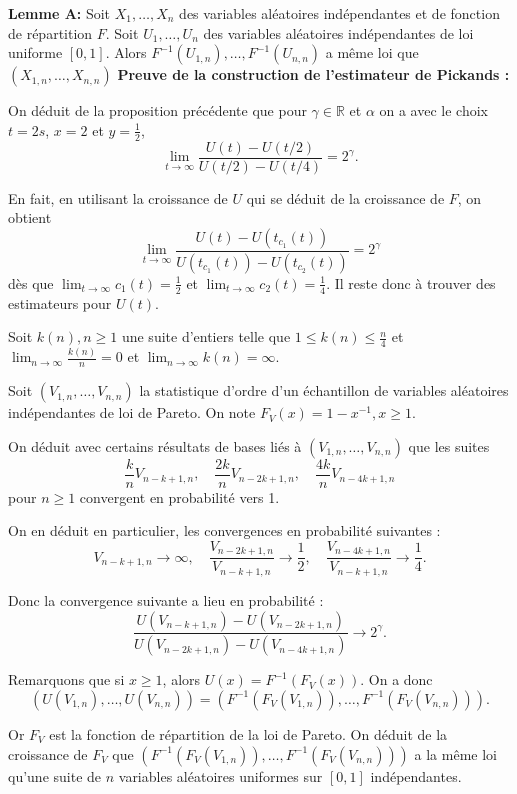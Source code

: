 \documentclass{article}
\theoremstyle{plain}
\theoremstyle{definition}
\theoremstyle{plain}
\begin{document}
\textbf{Lemme A:}
Soit \(X_1, \dots, X_n\) des variables aléatoires indépendantes et de fonction de répartition \(F\).
Soit \(U_1, \dots, U_n\) des variables aléatoires indépendantes de loi uniforme \(\left[0,1\right]\). Alors \(F^{-1}(U_{1,n}), \dots, F^{-1}(U_{n,n})\) a même loi que \((X_{1,n}, \dots, X_{n,n})\)\newline
\textbf{Preuve de la construction de l'estimateur de Pickands :}

On déduit de la proposition précédente que pour $\gamma \in \mathbb{R}$ et $\alpha$ on a avec le choix $t = 2s$, $x = 2$ et $y = \frac{1}{2}$,
\[
\lim_{t \to \infty} \frac{U(t) - U(t/2)}{U(t/2) - U(t/4)} = 2^{\gamma}.
\]

En fait, en utilisant la croissance de $U$ qui se déduit de la croissance de $F$, on obtient
\[
\lim_{t \to \infty} \frac{U(t) - U(t_{c_1}(t))}{U(t_{c_1}(t)) - U(t_{c_2}(t))} = 2^{\gamma}
\]
dès que $\lim_{t \to \infty} c_1(t) = \frac{1}{2}$ et $\lim_{t \to \infty} c_2(t) = \frac{1}{4}$. Il reste donc à trouver des estimateurs pour $U(t)$.

Soit $k(n), n \geq 1$ une suite d’entiers telle que $1 \leq k(n) \leq \frac{n}{4}$ et $\lim_{n \to \infty} \frac{k(n)}{n} = 0$ et $\lim_{n \to \infty} k(n) = \infty$.

Soit $(V_{1,n},\dots,V_{n,n})$ la statistique d’ordre d’un échantillon de variables aléatoires indépendantes de loi de Pareto. On note $F_V(x) = 1 - x^{-1}, x \geq 1$.

On déduit avec certains résultats de bases liés à $(V_{1,n},\dots,V_{n,n})$ que les suites
\[
\frac{k}{n} V_{n-k+1,n}, \quad \frac{2k}{n} V_{n-2k+1,n}, \quad \frac{4k}{n} V_{n-4k+1,n}
\]
pour \(n \geq 1\) convergent en probabilité vers 1.

On en déduit en particulier, les convergences en probabilité suivantes :
\[
V_{n-k+1,n}  \to \infty, \quad \frac{V_{n-2k+1,n}}{V_{n-k+1,n}} \to \frac{1}{2}, \quad \frac{V_{n-4k+1,n}}{V_{n-k+1,n}} \to \frac{1}{4}.
\]

Donc la convergence suivante a lieu en probabilité :
\[
\frac{U(V_{n-k+1,n}) - U(V_{n-2k+1,n})}{U(V_{n-2k+1,n}) - U(V_{n-4k+1,n})} \to 2^{\gamma}.
\]

Remarquons que si $x \geq 1$, alors $U(x) = F^{-1}(F_V(x))$. On a donc
\[
(U(V_{1,n}), \dots, U(V_{n,n})) = (F^{-1}(F_V(V_{1,n})), \dots, F^{-1}(F_V(V_{n,n}))).
\]

Or \(F_V\) est la fonction de répartition de la loi de Pareto. \newline
On déduit de la croissance de $F_V$ que $(F^{-1}(F_V(V_{1,n})),\dots, F^{-1}(F_V(V_{n,n})))$ a la même loi qu’une suite de $n$ variables aléatoires uniformes sur $[0,1]$ indépendantes. 
\end{document}
